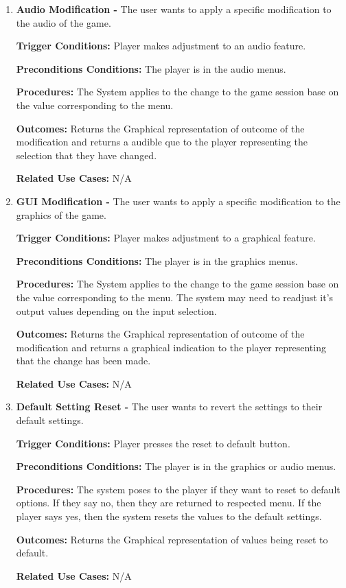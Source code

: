 \documentclass{article}
\begin{document}
\begin{enumerate}[{PUC}1. ]
	\item \textbf{Audio Modification -} The user wants to apply a specific modification to the audio of the game.\par
\textbf{Trigger Conditions: }Player makes adjustment to an audio feature. \par
\textbf{Preconditions Conditions: }The player is in the audio menus. \par
\textbf{Procedures: }The System applies to the change to the game session base on the value corresponding to the menu. \par
\textbf{Outcomes: }Returns the Graphical representation of outcome of the modification and returns a audible que to the player representing the selection that they have changed. \par
\textbf{Related Use Cases: }N/A \par

	\item \textbf{GUI Modification -} The user wants to apply a specific modification to the graphics of the game.\par
\textbf{Trigger Conditions: }Player makes adjustment to a graphical feature. \par
\textbf{Preconditions Conditions: }The player is in the graphics menus. \par
\textbf{Procedures: }The System applies to the change to the game session base on the value corresponding to the menu. The system may need to readjust it's output values depending on the input selection. \par
\textbf{Outcomes: }Returns the Graphical representation of outcome of the modification and returns a graphical indication to the player representing that the change has been made. \par
\textbf{Related Use Cases: }N/A \par

	\item \textbf{Default Setting Reset -} The user wants to revert the settings to their default settings.\par
\textbf{Trigger Conditions: }Player presses the reset to default button. \par
\textbf{Preconditions Conditions: }The player is in the graphics or audio menus. \par
\textbf{Procedures: }The system poses to the player if they want to reset to default options. If they say no, then they are returned to respected menu. If the player says yes, then the system resets the values to the default settings. \par
\textbf{Outcomes: }Returns the Graphical representation of values being reset to default. \par
\textbf{Related Use Cases: }N/A \par
	

\end{enumerate}
\end{document}
